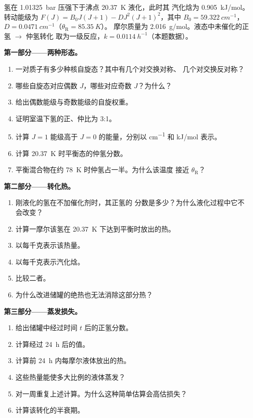 \begin{problem}
\label{pb:b3:statistical-thermo-applied:1}
氢在 \qty{1.01325}{bar} 压强下于沸点 \qty{20.37}{K} 液化，此时其
汽化焓为 \qty{0.905}{kJ/mol}。转动能级为 $F(J) = B_0J(J+1) -
D J^2(J+1)^2$，其中 $B_0 = \qty{59.322}{cm^{-1}}$，$D = \qty{0.0471}{cm^{-1}}$（$\theta_{\mathrm R} = \qty{85.35}{K}$）。
摩尔质量为 \qty{2.016}{g/mol}。液态中未催化的正氢 $\to$ 仲氢转化
取为一级反应，$k = \qty{0.0114}{h^{-1}}$（本题数据）。

\medskip\noindent\textbf{第一部分——两种形态。}
\begin{enumerate}
  \item 一对质子有多少种核自旋态？其中有几个对交换对称、
        几个对交换反对称？
  \item 哪些自旋态对应偶数 $J$，哪些对应奇数 $J$？为什么？
  \item 给出偶数能级与奇数能级的自旋权重。
  \item 证明室温下氢的正、仲比为 3:1。
  \item 计算 $J = 1$ 能级高于 $J = 0$ 的能量，分别以 \unit{cm^{-1}} 和
        \unit{kJ/mol} 表示。
  \item 计算 \qty{20.37}{K} 时平衡态的仲氢分数。
  \item 平衡混合物在约 \qty{78}{K} 时仲氢占一半。为什么该温度
        接近 $\theta_{\mathrm R}$？
\end{enumerate}

\medskip\noindent\textbf{第二部分——转化热。}
\begin{enumerate}[resume]
  \item 刚液化的氢在不加催化剂时，其正氢的
        分数是多少？为什么液化过程中它不会改变？
  \item 计算一摩尔该氢在
        \qty{20.37}{K} 下达到平衡时放出的热。
  \item 以每千克表示该热量。
  \item 以每千克表示汽化焓。
  \item 比较二者。
  \item 为什么改进储罐的绝热也无法消除这部分热？
\end{enumerate}

\medskip\noindent\textbf{第三部分——蒸发损失。}
\begin{enumerate}[resume]
  \item 给出储罐中经过时间 $t$ 后的正氢分数。
  \item 计算经过 \qty{24}{h} 后的值。
  \item 计算前 \qty{24}{h} 内每摩尔液体放出的热。
  \item 这些热量能使多大比例的液体蒸发？
  \item 对一周重复上述计算。为什么这种简单估算会高估损失？
  \item 计算该转化的半衰期。
\end{enumerate}


\end{problem}
